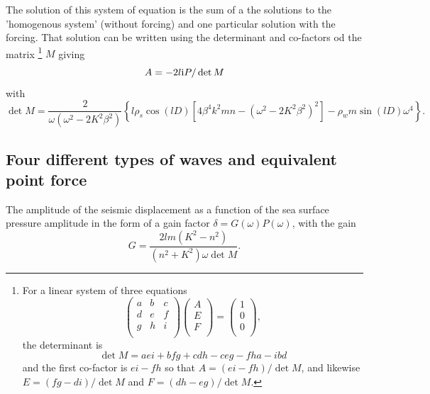 The solution of this system of equation is the sum of a the solutions to the 'homogenous 
system' (without forcing) and one particular solution with the forcing. That solution can be written 
using the determinant and co-factors od the matrix \footnote{For a linear system of three equations 
\begin{equation}
\begin{pmatrix} a &b &c \\  
d &e & f \\
g &h & i \\
\end{pmatrix}\begin{pmatrix}
A\\
E\\
F\\
\end{pmatrix} =\begin{pmatrix}
1\\
0\\
0\\
\end{pmatrix}, 
\end{equation} 
the determinant is 
\begin{equation}\det M = aei + bfg + cdh - ceg -fha -ibd \end{equation}
 and the first co-factor is  $ei-fh$ 
so that  $A=(ei - fh)/\det M$, and likewise $E=(fg - di)/\det M$ and $F=(dh - eg)/\det M$. }
 $M$
giving  
\begin{equation}
A= -2 l \mathrm{i} P / \det M
\end{equation}
with 
\begin{equation}
\det M = \frac{2}{ \omega\left (\omega^2- 2  K^2 \beta^2 \right)}\left\{ l \rho_s \cos(lD) \left[4 \beta^4 k^2 m n - 
            \left (\omega^2- 2  K^2 \beta^2 \right)^2  \right]
   - \rho_w m \sin(lD) \omega^4 \right\}.
\end{equation}

\subsection{Four different types of waves and equivalent point force}
The amplitude of the seismic displacement 
as a function of the sea surface pressure amplitude 
in the form of a gain factor  $\delta= G(\omega) P(\omega)$, with the gain
\begin{equation}
G = \frac{2 l  m  (K^2-n^2 )}{(n^2+K^2)\omega \det M}.
\end{equation}

